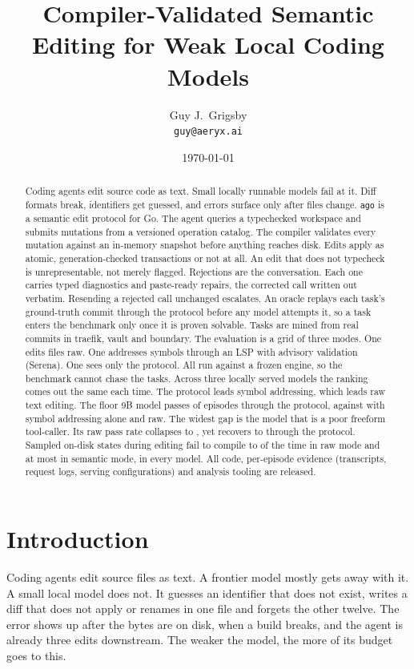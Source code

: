 \documentclass[11pt]{article}
\title{Compiler-Validated Semantic Editing for Weak Local Coding Models}
\author{Guy J.\ Grigsby\\\small\texttt{guy@aeryx.ai}}
\date{\today}
\begin{document}
\maketitle

\begin{abstract}
Coding agents edit source code as text. Small locally runnable models
fail at it. Diff formats break, identifiers get guessed, and errors
surface only after files change. \texttt{ago} is a semantic edit
protocol for Go. The agent queries a typechecked workspace and submits
mutations from a versioned operation catalog. The compiler validates
every mutation against an in-memory snapshot before anything reaches
disk. Edits apply as atomic, generation-checked transactions or not at
all. An edit that does not typecheck is unrepresentable, not merely
flagged. Rejections are the conversation. Each one carries typed
diagnostics and paste-ready repairs, the corrected call written out
verbatim. Resending a rejected call unchanged escalates. An oracle
replays each task's ground-truth commit through the protocol before any
model attempts it, so a task enters the benchmark only once it is proven
solvable. Tasks are mined from real commits in traefik, vault and boundary. The evaluation is a grid of three modes. One edits files raw.
One addresses symbols through an LSP with advisory validation (Serena).
One sees only the protocol. All run against a frozen engine, so the
benchmark cannot chase the tasks.
Across three locally served models the ranking comes out the same each
time. The protocol leads symbol addressing, which leads raw text
editing. The
floor 9B model passes \QwenSemanticPass{} of episodes through the
protocol, against \QwenSerenaPass{} with symbol addressing alone and
\QwenRawPass{} raw. The widest gap is the model that is a poor freeform
tool-caller. Its raw pass rate collapses to \GptOssRawPass{}, yet
recovers to \GptOssSemanticPass{} through the protocol. Sampled on-disk
states during editing fail to compile \InvalidRawMin{} to
\InvalidRawMax{} of the time in raw mode and at most
\InvalidSemanticMax{} in semantic mode, in every model. All code,
per-episode evidence (transcripts, request logs, serving
configurations) and analysis tooling are released.
\end{abstract}

\section{Introduction}
Coding agents edit source files as text. A frontier model mostly gets away
with it. A small local model does not. It guesses an identifier that
does not exist, writes a diff that does not apply or renames in one
file and forgets the other twelve. The error shows up after the bytes
are on disk, when a build breaks, and the agent is already three edits
downstream. The weaker the model, the more of its budget goes to this.
\end{document}
